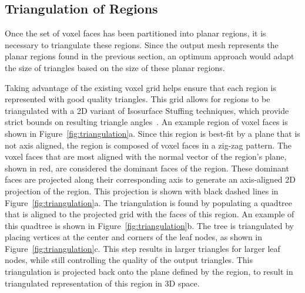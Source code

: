 \documentclass[12pt,onecolumn,oneside]{book}
\begin{document}
\subsection{Triangulation of Regions}
\label{ssec:voxel_triangulation}

Once the set of voxel faces has been partitioned into planar regions, it is necessary to triangulate these regions.  Since the output mesh represents the planar regions found in the previous section, an optimum approach would adapt the size of triangles based on the size of these planar regions.

Taking advantage of the existing voxel grid helps ensure that each region is represented with good quality triangles.  This grid allows for regions to be triangulated with a 2D variant of Isosurface Stuffing techniques, which provide strict bounds on resulting triangle angles~\cite{Isostuffing}.  An example region of voxel faces is shown in Figure~\ref{fig:triangulation}a.  Since this region is best-fit by a plane that is not axis aligned, the region is composed of voxel faces in a zig-zag pattern.  The voxel faces that are most aligned with the normal vector of the region's plane, shown in red, are considered the dominant faces of the region.  These dominant faces are projected along their corresponding axis to generate an axis-aligned 2D projection of the region.  This projection is shown with black dashed lines in Figure~\ref{fig:triangulation}a.  The triangulation is found by populating a quadtree that is aligned to the projected grid with the faces of this region.  An example of this quadtree is shown in Figure~\ref{fig:triangulation}b.  The tree is triangulated by placing vertices at the center and corners of the leaf nodes, as shown in Figure~\ref{fig:triangulation}c.  This step results in larger triangles for larger leaf nodes, while still controlling the quality of the output triangles.  This triangulation is projected back onto the plane defined by the region, to result in triangulated representation of this region in 3D space.
\end{document}
